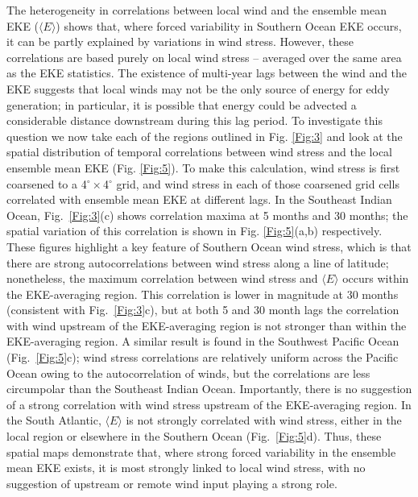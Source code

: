 \documentclass[linenumbers]{agujournal2019}
\begin{document}
The heterogeneity in correlations between local wind and the ensemble mean EKE ($\langle E \rangle$) shows that, where forced variability in Southern Ocean EKE occurs, it can be partly explained by variations in wind stress.
However, these correlations are based purely on local wind stress -- averaged over the same area as the EKE statistics.
The existence of multi-year lags between the wind and the EKE suggests that local winds may not be the only source of energy for eddy generation; in particular, it is possible that energy could be advected a considerable distance downstream during this lag period.
To investigate this question we now take each of the regions outlined in Fig. \ref{Fig:3} and look at the spatial distribution of temporal correlations between wind stress and the local ensemble mean EKE (Fig. \ref{Fig:5}).
To make this calculation, wind stress is first coarsened to a 4$^\circ \times $4$^\circ$ grid, and wind stress in each of those coarsened grid cells correlated with ensemble mean EKE at different lags.
In the Southeast Indian Ocean, Fig.~\ref{Fig:3}(c) shows correlation maxima at 5 months and 30 months; the spatial variation of this correlation is shown in Fig. \ref{Fig:5}(a,b) respectively.
These figures highlight a key feature of Southern Ocean wind stress, which is that there are strong autocorrelations between wind stress along a line of latitude; nonetheless, the maximum correlation between wind stress and $\langle E \rangle$ occurs within the EKE-averaging region.
This correlation is lower in magnitude at 30 months (consistent with Fig.~\ref{Fig:3}c), but at both 5 and 30 month lags the correlation with wind upstream of the EKE-averaging region is not stronger than within the EKE-averaging region.
A similar result is found in the Southwest Pacific Ocean (Fig.~\ref{Fig:5}c); wind stress correlations are relatively uniform across the Pacific Ocean owing to the autocorrelation of winds, but the correlations are less circumpolar than the Southeast Indian Ocean.
Importantly, there is no suggestion of a strong correlation with wind stress upstream of the EKE-averaging region.
In the South Atlantic, $\langle E \rangle$ is not strongly correlated with wind stress, either in the local region or elsewhere in the Southern Ocean (Fig.~\ref{Fig:5}d).
Thus, these spatial maps demonstrate that, where strong forced variability in the ensemble mean EKE exists, it is most strongly linked to local wind stress, with no suggestion of upstream or remote wind input playing a strong role. 
\end{document}
